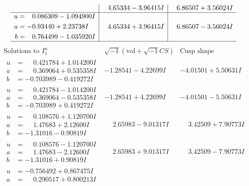 \documentclass[1p]{elsarticle_modified}
\theoremstyle{definition}
\newcommand{\I}{\sqrt{-1}}
\begin{document}
$$\begin{array}{c|c|c}
 & \phantom{-}4.65334 - 3.96415 I & \phantom{-}6.86507 + 3.56024 I \\ \hline\begin{aligned}
u &= \phantom{-}0.086309 - 1.094900 I \\
a &= -0.93440 + 2.23738 I \\
b &= \phantom{-}0.764499 - 1.035920 I\end{aligned}
 & \phantom{-}4.65334 + 3.96415 I & \phantom{-}6.86507 - 3.56024 I\\
 \hline 
 \end{array}$$\newpage$$\begin{array}{c|c|c}  
\text{Solutions to }I^u_{1}& \I (\text{vol} + \sqrt{-1}CS) & \text{Cusp shape}\\
 \hline 
\begin{aligned}
u &= \phantom{-}0.421784 + 1.014200 I \\
a &= \phantom{-}0.369064 + 0.535358 I \\
b &= -0.703989 - 0.419272 I\end{aligned}
 & -1.28541 - 4.22699 I & -4.01501 + 5.50631 I \\ \hline\begin{aligned}
u &= \phantom{-}0.421784 - 1.014200 I \\
a &= \phantom{-}0.369064 - 0.535358 I \\
b &= -0.703989 + 0.419272 I\end{aligned}
 & -1.28541 + 4.22699 I & -4.01501 - 5.50631 I \\ \hline\begin{aligned}
u &= \phantom{-}0.108576 + 1.120700 I \\
a &= \phantom{-}1.47683 + 2.12600 I \\
b &= -1.31016 - 0.90819 I\end{aligned}
 & \phantom{-}2.65983 - 9.01317 I & \phantom{-}3.42509 + 7.90773 I \\ \hline\begin{aligned}
u &= \phantom{-}0.108576 - 1.120700 I \\
a &= \phantom{-}1.47683 - 2.12600 I \\
b &= -1.31016 + 0.90819 I\end{aligned}
 & \phantom{-}2.65983 + 9.01317 I & \phantom{-}3.42509 - 7.90773 I \\ \hline\begin{aligned}
u &= -0.756492 + 0.867475 I \\
a &= \phantom{-}0.290517 + 0.800213 I \\

\end{aligned}
\end{array}$$
\end{document}
